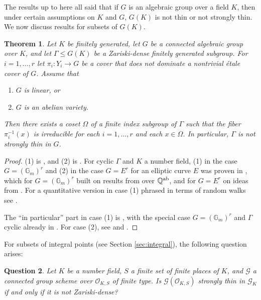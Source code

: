 \documentclass[10pt,a4paper]{amsart}
\theoremstyle{plain}
\newtheorem{theorem}{Theorem}
\newtheorem{question}[theorem]{Question}
\theoremstyle{remark}
\numberwithin{theorem}{section}
\begin{document}
The results up to here
all said that if $G$ is an algebraic group over a field $K$,
then under certain assumptions on $K$ and $G$, $G(K)$ is not thin or not strongly thin.
We now discuss results for subsets of $G(K)$.

\begin{theorem}\label{thm:alg_groups_fingen}
Let $K$ be finitely generated, let $G$ be a connected algebraic group over $K$,
and let $\Gamma\leq G(K)$ be a Zariski-dense finitely generated subgroup.
For $i=1,\dots,r$ let $\pi_i\colon Y_i\rightarrow G$ be a cover that does not dominate a nontrivial \'etale cover of $G$.
Assume that
\begin{enumerate}
    \item $G$ is linear, or
    \item $G$ is an abelian variety.
\end{enumerate}
Then there exists a coset $\Omega$ of a finite index subgroup of $\Gamma$ such that the fiber $\pi_i^{-1}(x)$ is irreducible for each $i=1,\dots,r$ and each $x\in\Omega$.
In particular, $\Gamma$ is not strongly thin in $G$.
\end{theorem}

\begin{proof}
(1) is \cite[Theorem 1.3]{Liu}, and 
(2) is \cite[Theorem 1.4]{CDJLZ}.
For cyclic $\Gamma$ and $K$ a number field,
(1) in the case $G=(\mathbb{G}_m)^r$ and (2) in the case $G=E^r$ for an elliptic curve $E$ was proven in \cite{Zannier},
which for $G=(\mathbb{G}_m)^r$ built on results from \cite{DZ} over $\mathbb{Q}^{\rm ab}$, and for $G=E^r$ on ideas from \cite{Zannier_Pisot}.
For a quantitative version in case (1) phrased in terms of random walks see \cite{BSG}.

The ``in particular'' part
in case (1) is \cite[Corollary 1.4]{Liu},
with the special case $G=(\mathbb{G}_m)^r$ and $\Gamma$ cyclic
already in \cite[Theorem 4]{Zannier}.
For case (2),   
see \cite[Proposition 4.17]{CDJLZ} and \cite[Theorem~1.3]{CDJLZ}.
\end{proof}

For subsets of integral points (see Section \ref{sec:integral}), the following question arises:

\begin{question}\label{q:alg_groups_integral}
Let $K$ be a number field,
$S$ a finite set of finite places of $K$,
and $\mathcal{G}$ a connected group scheme over $\mathcal{O}_{K,S}$ of finite type.
Is $\mathcal{G}(\mathcal{O}_{K,S})$
strongly thin in $\mathcal{G}_K$ if and only if it is not Zariski-dense?
\end{question}
\end{document}
